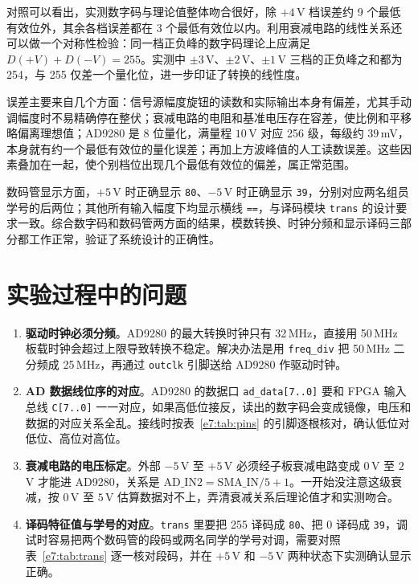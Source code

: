\documentclass{ctexrep}
\begin{document}
对照可以看出，实测数字码与理论值整体吻合很好，除 $+4\,$V 档误差约 9 个最低有效位外，其余各档误差都在 3 个最低有效位以内。利用衰减电路的线性关系还可以做一个对称性检验：同一档正负峰的数字码理论上应满足 $D(+V) + D(-V) = 255$。实测中 $\pm3\,$V、$\pm2\,$V、$\pm1\,$V 三档的正负峰之和都为 254，与 255 仅差一个量化位，进一步印证了转换的线性度。

误差主要来自几个方面：信号源幅度旋钮的读数和实际输出本身有偏差，尤其手动调幅度时不易精确停在整伏；衰减电路的电阻和基准电压存在容差，使比例和平移略偏离理想值；AD9280 是 8 位量化，满量程 $10\,$V 对应 256 级，每级约 $39\,$mV，本身就有约一个最低有效位的量化误差；再加上方波峰值的人工读数误差。这些因素叠加在一起，使个别档位出现几个最低有效位的偏差，属正常范围。

数码管显示方面，$+5\,$V 时正确显示 \texttt{80}、$-5\,$V 时正确显示 \texttt{39}，分别对应两名组员学号的后两位；其他所有输入幅度下均显示横线 \texttt{==}，与译码模块 \texttt{trans} 的设计要求一致。综合数字码和数码管两方面的结果，模数转换、时钟分频和显示译码三部分都工作正常，验证了系统设计的正确性。

\section{实验过程中的问题}

\begin{enumerate}
    \item \textbf{驱动时钟必须分频}。AD9280 的最大转换时钟只有 32\,MHz，直接用 50\,MHz 板载时钟会超过上限导致转换不稳定。解决办法是用 \texttt{freq\_div} 把 50\,MHz 二分频成 25\,MHz，再通过 \texttt{outclk} 引脚送给 AD9280 作驱动时钟。
    \item \textbf{AD 数据线位序的对应}。AD9280 的数据口 \texttt{ad\_data[7..0]} 要和 FPGA 输入总线 \texttt{C[7..0]} 一一对应，如果高低位接反，读出的数字码会变成镜像，电压和数据的对应关系全乱。接线时按表~\ref{e7:tab:pins} 的引脚逐根核对，确认低位对低位、高位对高位。
    \item \textbf{衰减电路的电压标定}。外部 $-5\,$V 至 $+5\,$V 必须经子板衰减电路变成 $0\,$V 至 $2\,$V 才能进 AD9280，关系是 $\mathrm{AD\_IN2} = \mathrm{SMA\_IN}/5 + 1$。一开始没注意这级衰减，按 $0\,$V 至 $5\,$V 估算数据对不上，弄清衰减关系后理论值才和实测吻合。
    \item \textbf{译码特征值与学号的对应}。\texttt{trans} 里要把 255 译码成 \texttt{80}、把 0 译码成 \texttt{39}，调试时容易把两个数码管的段码或两名同学的学号对调，需要对照表~\ref{e7:tab:trans} 逐一核对段码，并在 $+5\,$V 和 $-5\,$V 两种状态下实测确认显示正确。
\end{enumerate}
\end{document}
